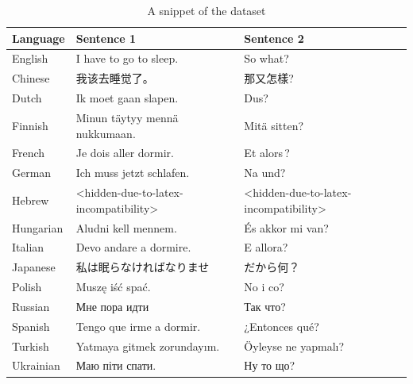 \documentclass[a4paper]{article}
\begin{document}
\begin{CJK}{UTF8}{gbsn}
    \begin{table}[htbp]
        \centering
        \begin{tabular}{|l|l|l|}
            \hline
            \textbf{Language} & \textbf{Sentence 1}                   & \textbf{Sentence 2}                   \\
            \hline
            English           & I have to go to sleep.                & So what?                              \\
            Chinese           & 我该去睡觉了。                               & 那又怎樣?                                 \\
            Dutch             & Ik moet gaan slapen.                  & Dus?                                  \\
            Finnish           & Minun täytyy mennä nukkumaan.         & Mitä sitten?                          \\
            French            & Je dois aller dormir.                 & Et alors ?                            \\
            German            & Ich muss jetzt schlafen.              & Na und?                               \\
            Hebrew            & <hidden-due-to-latex-incompatibility> & <hidden-due-to-latex-incompatibility> \\
            Hungarian         & Aludni kell mennem.                   & És akkor mi van?                      \\
            Italian           & Devo andare a dormire.                & E allora?                             \\
            Japanese          & 私は眠らなければなりませ                          & だから何？                                 \\
            Polish            & Muszę iść spać.                       & No i co?                              \\
            Russian           & Мне пора идти                         & Так что?                              \\
            Spanish           & Tengo que irme a dormir.              & ¿Entonces qué?                        \\
            Turkish           & Yatmaya gitmek zorundayım.            & Öyleyse ne yapmalı?                   \\
            Ukrainian         & Маю піти спати.                       & Ну то що?                             \\
            \hline
        \end{tabular}
        \caption{A snippet of the dataset}
        \label{table:parallel_sentence}
    \end{table}
\end{CJK}
\end{document}
